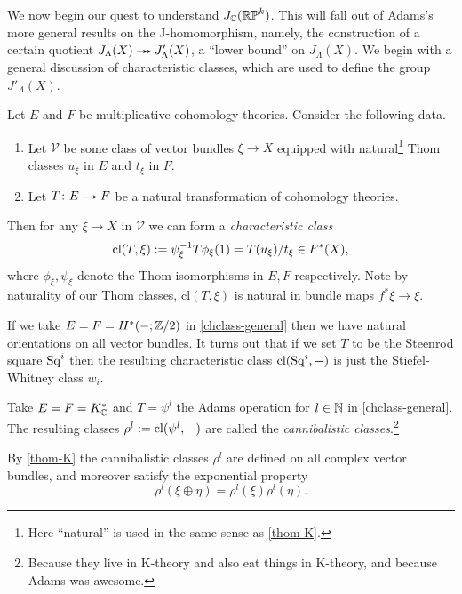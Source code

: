We now begin our quest to understand $J_{\mathbb{C}}(\mathbb{RP}^k)$. This will fall
out of Adams's more general results on the J-homomorphism, namely, the
construction of a certain quotient $J_\Lambda(X) \surj
J'_\Lambda(X)$, a ``lower bound'' on $J_\Lambda(X)$. We begin with a
general discussion of characteristic classes, which are used to define
the group $J'_\Lambda(X)$.

\renewcommand{\V}{\mathcal{V}}
\newcommand{\cl}{\mathrm{cl}}
\begin{nothing}
  \label{chclass-general}
  Let $E$ and $F$ be multiplicative cohomology theories. Consider the
  following data.
  \begin{enumerate}
  \item Let $\V$ be some class of vector bundles $\xi \to X$ equipped
    with natural\footnote{Here ``natural'' is used in the same sense
      as \eqref{thom-K}.} Thom classes $u_\xi$ in $E$ and $t_\xi$ in
    $F$.
  \item Let $T \c E \to F$ be a natural transformation of cohomology
    theories.
  \end{enumerate}
  Then for any $\xi \to X$ in $\V$ we can form a \emph{characteristic
    class}
  \[
  \cl(T,\xi) \ce \psi_\xi^{-1}T\phi_\xi(1) = T(u_\xi)/t_\xi \in
  F^*(X),
  \]
  where $\phi_\xi,\psi_\xi$ denote the Thom isomorphisms in $E,F$
  respectively. Note by naturality of our Thom classes, $\cl(T,\xi)$
  is natural in bundle maps $f^*\xi \to \xi$.
\end{nothing}

\begin{example}
  \label{stiefel-whitney}
  If we take $E = F = H^*(-;\mathbb{Z}/2)$ in \eqref{chclass-general} then we
  have natural orientations on all vector bundles. It turns out that
  if we set $T$ to be the Steenrod square $\operatorname{Sq}^i$ then the resulting
  characteristic class $\cl(\Sq^i,-)$ is just the Stiefel-Whitney
  class $w_i$.
\end{example}

\begin{definition}
  Take $E = F = K_{\mathbb{C}}^*$ and $T = \psi^l$ the Adams operation for $l
  \in \mathbb{N}$ in \eqref{chclass-general}. The resulting classes $\rho^l \ce
  \cl(\psi^l,-)$ are called the \emph{cannibalistic
    classes}.\footnote{Because they live in K-theory and also eat
    things in K-theory, and because Adams was awesome.}
\end{definition}

\begin{remark}
  By \eqref{thom-K} the cannibalistic classes $\rho^l$ are defined on
  all complex vector bundles, and moreover satisfy the exponential
  property
  \begin{equation}
    \label{exponential}
    \rho^l(\xi \oplus \eta) = \rho^l(\xi)\rho^l(\eta).
  \end{equation}
\end{remark}


